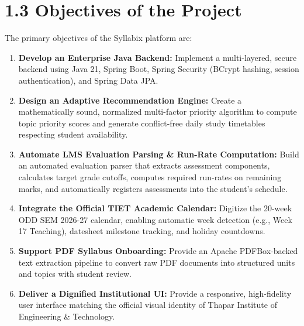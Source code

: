 \documentclass[12pt,a4paper]{report}
\begin{document}
\section{1.3 Objectives of the Project}
The primary objectives of the Syllabix platform are:
\begin{enumerate}
    \item \textbf{Develop an Enterprise Java Backend:} Implement a multi-layered, secure backend using Java 21, Spring Boot, Spring Security (BCrypt hashing, session authentication), and Spring Data JPA.
    \item \textbf{Design an Adaptive Recommendation Engine:} Create a mathematically sound, normalized multi-factor priority algorithm to compute topic priority scores and generate conflict-free daily study timetables respecting student availability.
    \item \textbf{Automate LMS Evaluation Parsing \& Run-Rate Computation:} Build an automated evaluation parser that extracts assessment components, calculates target grade cutoffs, computes required run-rates on remaining marks, and automatically registers assessments into the student's schedule.
    \item \textbf{Integrate the Official TIET Academic Calendar:} Digitize the 20-week ODD SEM 2026-27 calendar, enabling automatic week detection (e.g., Week 17 Teaching), datesheet milestone tracking, and holiday countdowns.
    \item \textbf{Support PDF Syllabus Onboarding:} Provide an Apache PDFBox-backed text extraction pipeline to convert raw PDF documents into structured units and topics with student review.
    \item \textbf{Deliver a Dignified Institutional UI:} Provide a responsive, high-fidelity user interface matching the official visual identity of Thapar Institute of Engineering \& Technology.
\end{enumerate}
\end{document}

